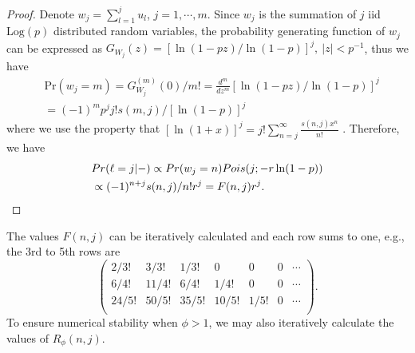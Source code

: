 \documentclass[journal]{IEEEtran}
\newcommand{\beqs}{\begin{eqnarray}}
\newcommand{\eeqs}{\end{eqnarray}}
\begin{document}
\begin{proof}
Denote $w_{j}= \sum_{l=1}^ju_{l}$, $j=1,\cdots,m$. Since $w_{j}$ is the summation of $j$ iid $\mbox{Log}(p)$ distributed random variables, the probability generating function of $w_{j}$ can be expressed as
$
G_{W_{j}}(z)=
\left[{\ln(1-pz)}/{\ln(1-p)}\right]^j,~ |z|<{p^{-1}}
$, thus we have
\beqs
& \mbox{Pr}(w_{j}=m) = {G_{W_{j}}^{(m)}(0)}/{m!} = \frac{d^{m}}{dz^{m}} [\ln(1-p z)/{\ln(1-p)}]^j \nonumber\\ &= (-1)^m p^j j! s(m,j)/[\ln(1-p)]^j \eeqs
where we use the property that $[\ln(1+x)]^j = j!\sum_{n=j}^\infty\frac{s(n,j)x^n}{n!}$ \cite{johnson2005univariate}.
Therefore, we have
\beqs
& \mbox{Pr}(\ell = j|-) \propto  \mbox{Pr}(w_{j}=n) \mbox{Pois}(j;-r\ln(1-p)) \nonumber\\ &\propto (-1)^{n+j}s(n,j)/n! r^j =F(n,j)r^j. \qedhere
\eeqs
\end{proof}
The values $F(n,j)$ can be iteratively calculated and each row sums to one, e.g.,
the 3rd to 5th rows are
\[ \left( \begin{array}{ccccccc}
2/3! & 3/3! & 1/3! & 0 & 0 & 0& \cdots \\
6/4! & 11/4! & 6/4! & 1/4! & 0 & 0& \cdots \\
24/5! & 50/5! & 35/5! & 10/5! & 1/5! & 0& \cdots \\
\end{array} \right).\]
To ensure numerical stability when $\phi>1$, we may also iteratively calculate the values of $R_\phi(n,j)$.
\end{document}

